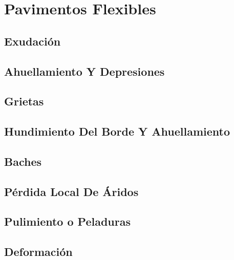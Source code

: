 \documentclass[letterpaper,10pt,spanish]{sphinxmanual}
\begin{document}
\section{Pavimentos Flexibles}
\label{patologia/flexibles:patologia-flexibles}\label{patologia/flexibles::doc}\label{patologia/flexibles:pavimentos-flexibles}

\subsection{Exudación}
\label{patologia/flexibles:exudacion}

\subsection{Ahuellamiento Y Depresiones}
\label{patologia/flexibles:ahuellamiento-y-depresiones}

\subsection{Grietas}
\label{patologia/flexibles:grietas}

\subsection{Hundimiento Del Borde Y Ahuellamiento}
\label{patologia/flexibles:hundimiento-del-borde-y-ahuellamiento}

\subsection{Baches}
\label{patologia/flexibles:baches}

\subsection{Pérdida Local De Áridos}
\label{patologia/flexibles:perdida-local-de-aridos}

\subsection{Pulimiento o Peladuras}
\label{patologia/flexibles:pulimiento-o-peladuras}

\subsection{Deformación}
\label{patologia/flexibles:deformacion}\begin{quote}
\end{quote}
\end{document}
